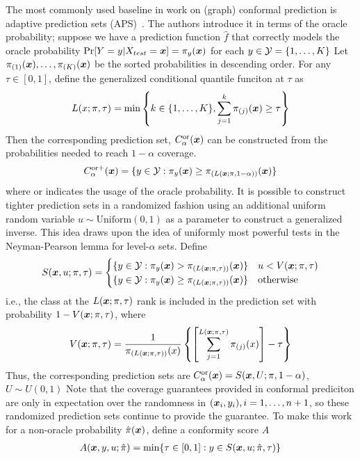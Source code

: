 The most commonly used baseline in work on (graph) conformal prediction is adaptive prediction sets (APS)~\citep{romano2020classification}. 
The authors introduce it in terms of the oracle probability; suppose we have a prediction function $\hat{f}$ that correctly models the oracle probability $\Pr[Y=y|X_{test}={\bm{x}}] = \pi_y({\bm{x}})$ for each $y \in {\mathcal{Y}} = \{1, \dots, K\}$ 
Let $\pi_{(1)}({\bm{x}}), \dots, \pi_{(K)}({\bm{x}})$ be the sorted probabilities in descending order.
For any $\tau \in [0, 1]$, define the generalized conditional quantile funciton at $\tau$ as
\begin{align}
    L(x; \pi, \tau) =  \min\left\{ k \in \{1, \dots, K\}, \sum\limits_{j=1}^k \pi_{(j)}({\bm{x}}) \geq \tau \right\}
    \label{eq:APS:L}
\end{align}
Then the corresponding prediction set, $C_\alpha^{\text{or}}({\bm{x}})$ can be constructed from the probabilities needed to reach $1-\alpha$ coverage.
\[
    C_\alpha^{\text{or+}}({\bm{x}}) = \{y \in {\mathcal{Y}}: \pi_y({\bm{x}}) \geq \pi_{(L({\bm{x}}; \pi, 1-\alpha))}({\bm{x}})\}
\]
where $\text{or}$ indicates the usage of the oracle probability.
It is possible to construct tighter prediction sets in a randomized fashion using an additional uniform random variable $u \sim \text{Uniform}(0, 1)$ as a parameter to construct a generalized inverse. 
This idea draws upon the idea of uniformly most powerful tests in the Neyman-Pearson lemma for level-$\alpha$ sets.
Define
\begin{align}
    S({\bm{x}}, u; \pi, \tau) = \begin{cases}
        \{y \in {\mathcal{Y}}: \pi_y({\bm{x}}) > \pi_{(L({\bm{x}}; \pi, \tau))}({\bm{x}})\} & u < V({\bm{x}}; \pi, \tau) \\
        \{y \in {\mathcal{Y}}: \pi_y({\bm{x}}) \geq \pi_{(L({\bm{x}}; \pi, \tau))}({\bm{x}})\} & \text{otherwise}
    \end{cases}
    \label{eq:APS:S}    
\end{align}
i.e., the class at the $L({\bm{x}}; \pi, \tau)$ rank is included in the prediction set with probability $1 - V({\bm{x}}; \pi, \tau)$, where
\[
V({\bm{x}}; \pi, \tau) = \frac{1}{\pi_{(L({\bm{x}}; \pi, \tau))}(x)} \left\{ \left[\sum\limits_{j=1}^{L({\bm{x}}; \pi, \tau)}{\pi_{(j)}(x)} \right] - \tau \right\}
\]
Thus, the corresponding prediction sets are $C_\alpha^{\text{or}}({\bm{x}}) = S({\bm{x}}, U; \pi, 1 - \alpha)$, $U \sim U(0, 1)$
Note that the coverage guarantees provided in conformal prediciton are only in expectation over the randomness in $({\bm{x}}_i, y_i), i = 1, \dots, n+1$, so these randomized prediction sets continue to provide the guarantee.
To make this work for a non-oracle probability $\hat{\pi}({\bm{x}})$, define a conformity score $A$
\begin{align}
    A({\bm{x}}, y, u;\hat{\pi}) = \min\{\tau \in [0, 1]: y \in S({\bm{x}}, u; \hat{\pi}, \tau)\}
    \label{eq:APS:score}
\end{align}

